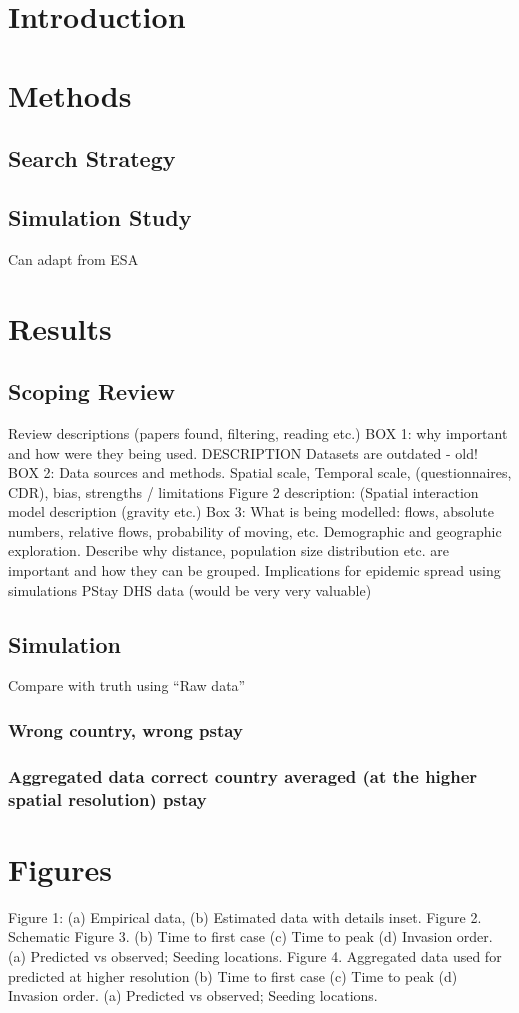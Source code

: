 \documentclass[a4paper,12pt]{article}
\begin{document}
\title{}
\author{}
\section{Introduction}
\section{Methods}
\subsection{Search Strategy}
\subsection{Simulation Study}
Can adapt from ESA
\section{Results}
\subsection{Scoping Review}
Review descriptions (papers found, filtering, reading etc.)
BOX 1: why important and how were they being used. DESCRIPTION
Datasets are outdated - old!
BOX 2: Data sources and methods. Spatial scale, Temporal scale, (questionnaires, CDR), bias, strengths / limitations
Figure 2 description: (Spatial interaction model description (gravity etc.)
Box 3: What is being modelled: flows, absolute numbers, relative flows, probability of moving, etc. 
Demographic and geographic exploration. Describe why distance, population size distribution etc. are important and how they can be grouped.
Implications for epidemic spread using simulations
PStay DHS data (would be very very valuable)
\subsection{Simulation}
Compare with truth using ``Raw data''
\subsubsection{Wrong country, wrong pstay}
\subsubsection{Aggregated data correct country averaged (at the higher spatial resolution) pstay}
\section{Figures}
Figure 1: (a) Empirical data, (b) Estimated data with details inset.
Figure 2. Schematic 
Figure 3. (b) Time to first case (c) Time to peak (d) Invasion order.
(a) Predicted vs observed; Seeding locations.
Figure 4. Aggregated data used for predicted at
higher resolution (b) Time to first case (c) Time to peak (d) Invasion order.
(a) Predicted vs observed; Seeding locations.
\end{document}
